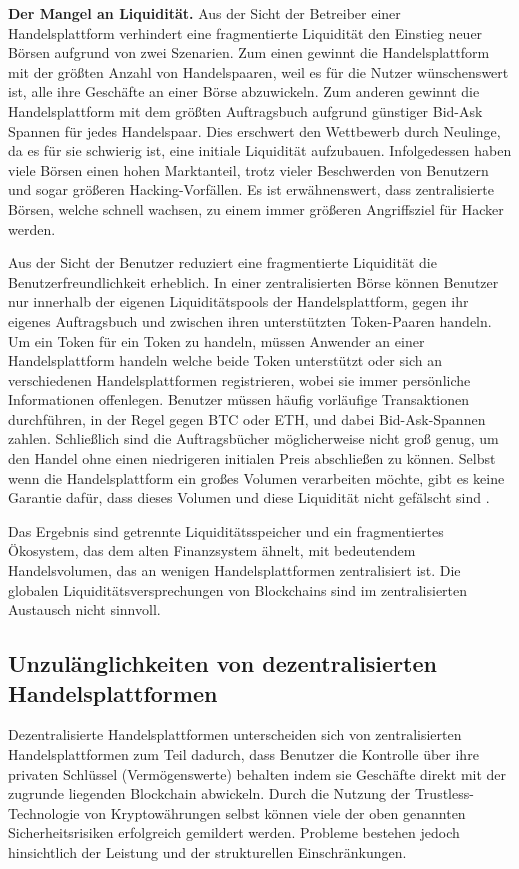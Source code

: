 \documentclass[UTF8,nofonts]{article}
\begin{document}
\begin{multicols}{2}
\textbf{Der Mangel an Liquidität.} Aus der Sicht der Betreiber einer Handelsplattform verhindert eine fragmentierte Liquidität den Einstieg neuer Börsen aufgrund von zwei Szenarien. Zum einen gewinnt die Handelsplattform mit der größten Anzahl von Handelspaaren, weil es für die Nutzer wünschenswert ist, alle ihre Geschäfte an einer Börse abzuwickeln. Zum anderen gewinnt die Handelsplattform mit dem größten Auftragsbuch aufgrund günstiger Bid-Ask Spannen für jedes Handelspaar. Dies erschwert den Wettbewerb durch Neulinge, da es für sie schwierig ist, eine initiale Liquidität aufzubauen. Infolgedessen haben viele Börsen einen hohen Marktanteil, trotz vieler Beschwerden von Benutzern und sogar größeren Hacking-Vorfällen. Es ist erwähnenswert, dass zentralisierte Börsen, welche schnell wachsen, zu einem immer größeren Angriffsziel für Hacker werden.

Aus der Sicht der Benutzer reduziert eine fragmentierte Liquidität die Benutzerfreundlichkeit erheblich. In einer zentralisierten Börse können Benutzer nur innerhalb der eigenen Liquiditätspools der Handelsplattform, gegen ihr eigenes Auftragsbuch und zwischen ihren unterstützten Token-Paaren handeln. Um ein Token für ein Token zu handeln, müssen Anwender an einer Handelsplattform handeln welche beide Token unterstützt oder sich an verschiedenen Handelsplattformen registrieren, wobei sie immer persönliche Informationen offenlegen. Benutzer müssen häufig vorläufige Transaktionen durchführen, in der Regel gegen BTC oder ETH, und dabei Bid-Ask-Spannen zahlen. Schließlich sind die Auftragsbücher möglicherweise nicht groß genug, um den Handel ohne einen niedrigeren initialen Preis abschließen zu können. Selbst wenn die Handelsplattform ein großes Volumen verarbeiten möchte, gibt es keine Garantie dafür, dass dieses Volumen und diese Liquidität nicht gefälscht sind \cite{fakevolume}.

Das Ergebnis sind getrennte Liquiditätsspeicher und ein fragmentiertes Ökosystem, das dem alten Finanzsystem ähnelt, mit bedeutendem Handelsvolumen, das an wenigen Handelsplattformen zentralisiert ist. Die globalen Liquiditätsversprechungen von Blockchains sind im zentralisierten Austausch nicht sinnvoll.

\subsection{Unzulänglichkeiten von dezentralisierten Handelsplattformen}
Dezentralisierte Handelsplattformen unterscheiden sich von zentralisierten Handelsplattformen zum Teil dadurch, dass Benutzer die Kontrolle über ihre privaten Schlüssel (Vermögenswerte) behalten indem sie Geschäfte direkt mit der zugrunde liegenden Blockchain abwickeln. Durch die Nutzung der Trustless-Technologie von Kryptowährungen selbst können viele der oben genannten Sicherheitsrisiken erfolgreich gemildert werden. Probleme bestehen jedoch hinsichtlich der Leistung und der strukturellen Einschränkungen.


\end{multicols}
\end{document}
